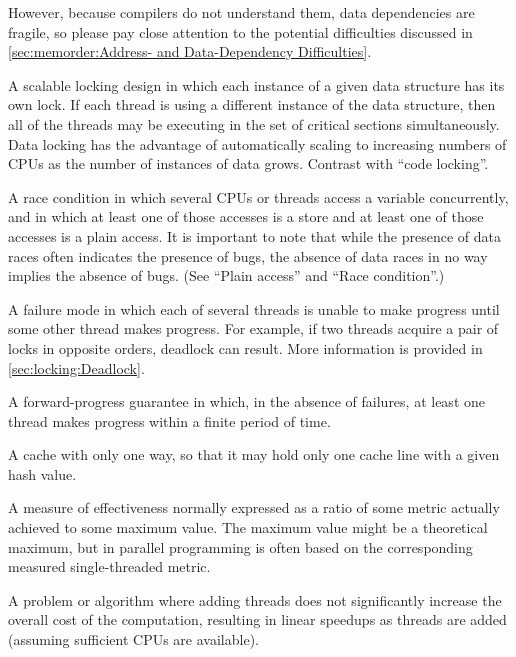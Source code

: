 \begin{description}
	However, because compilers do not understand them, data
	dependencies are fragile, so please pay close attention to the
	potential difficulties discussed in
	\cref{sec:memorder:Address- and Data-Dependency Difficulties}.
\item[\IXGh{Data}{Locking}:]
	A scalable locking design in which each instance of a given
	data structure has its own lock.
	If each thread is using a different instance of the
	data structure, then all of the threads may be executing in
	the set of critical sections simultaneously.
	Data locking has the advantage of automatically scaling to
	increasing numbers of CPUs as the number of instances of
	data grows.
	Contrast with ``code locking''.
\item[\IXG{Data Race}:]
	A race condition in which several CPUs or threads access
	a variable concurrently, and in which at least one of those
	accesses is a store and at least one of those accesses
	is a plain access.
	It is important to note that while the presence of data races
	often indicates the presence of bugs, the absence of data races
	in no way implies the absence of bugs.
	(See ``Plain access'' and ``Race condition''.)
\item[\IXG{Deadlock}:]
	A failure mode in which each of several threads is unable to
	make progress until some other thread makes progress.
	For example, if two threads acquire a pair of locks in opposite
	orders, deadlock can result.
	More information is provided in
	\cref{sec:locking:Deadlock}.
\item[\IXG{Deadlock Free}:]
	A forward-progress guarantee in which, in the absence of
	failures, at least one thread makes progress within a finite
	period of time.
\item[\IXGh{Direct-Mapped}{Cache}:]
	A cache with only one way, so that it may hold only one cache
	line with a given hash value.
\item[\IXG{Efficiency}:]
	A measure of effectiveness normally expressed as a ratio
	of some metric actually achieved to some maximum value.
	The maximum value might be a theoretical maximum, but in
	parallel programming is often based on the corresponding
	measured single-threaded metric.
\item[\IXG{Embarrassingly Parallel}:]
	A problem or algorithm where adding threads does not significantly
	increase the overall cost of the computation, resulting in
	linear speedups as threads are added (assuming sufficient
	CPUs are available).
\item[\IXGalth{Energy Efficiency}{energy}{efficiency}:]

\end{description}
